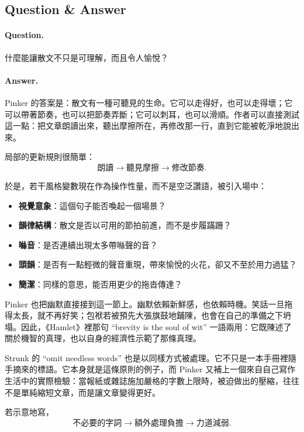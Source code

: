 \subsection{Question \& Answer}

\paragraph{Question.} 什麼能讓散文不只是可理解，而且令人愉悅？

\paragraph{Answer.} Pinker 的答案是：散文有一種可聽見的生命。它可以走得好，也可以走得壞；它可以帶著節奏，也可以把節奏弄斷；它可以刺耳，也可以滑順。作者可以直接測試這一點：把文章朗讀出來，聽出摩擦所在，再修改那一行，直到它能被乾淨地說出來。

局部的更新規則很簡單：
\begin{equation}
\text{朗讀} \to \text{聽見摩擦} \to \text{修改節奏}.
\end{equation}

於是，若干風格變數現在作為操作性量，而不是空泛讚語，被引入場中：
\begin{itemize}
\item \textbf{視覺意象}：這個句子能否喚起一個場景？
\item \textbf{韻律結構}：散文是否以可用的節拍前進，而不是步履蹣跚？
\item \textbf{噝音}：是否連續出現太多帶噝聲的音？
\item \textbf{頭韻}：是否有一點輕微的聲音重現，帶來愉悅的火花，卻又不至於用力過猛？
\item \textbf{簡潔}：同樣的意思，能否用更少的拖沓傳達？
\end{itemize}

Pinker 也把幽默直接接到這一節上。幽默依賴新鮮感，也依賴時機。笑話一旦拖得太長，就不再好笑；包袱若被預先大張旗鼓地鋪陳，也會在自己的準備之下坍塌。因此，《Hamlet》裡那句 ``brevity is the soul of wit'' 一語兩用：它既陳述了關於機智的真理，也以自身的經濟性示範了那條真理。

Strunk 的 ``omit needless words'' 也是以同樣方式被處理。它不只是一本手冊裡隨手摘來的標語。它本身就是這條原則的例子，而 Pinker 又補上一個來自自己寫作生活中的實際檢驗：當報紙或雜誌施加嚴格的字數上限時，被迫做出的壓縮，往往不是單純縮短文章，而是讓文章變得更好。

若示意地寫，
\begin{equation}
\text{不必要的字詞} \to \text{額外處理負擔} \to \text{力道減弱}.
\end{equation}

